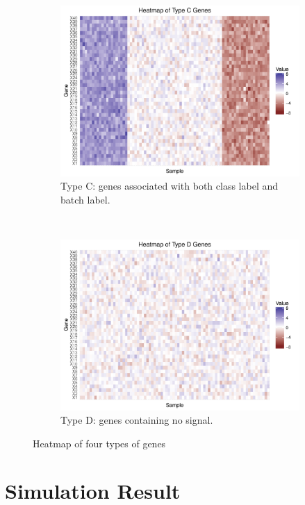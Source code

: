 \documentclass[11pt]{article}
\begin{document}
\begin{figure}[h!]
\begin{subfigure}[t]{0.4\textwidth}
    \includegraphics[width = \textwidth]{figures/Type_C_Gene.pdf}
    \caption{Type C: genes associated with both class label and batch label.}
    \end{subfigure}
    ~
    \centering
    \begin{subfigure}[t]{0.4\textwidth}
    \includegraphics[width = \textwidth]{figures/Type_D_Gene.pdf}
    \caption{Type D: genes containing no signal.}
    \end{subfigure}
    \caption{Heatmap of four types of genes}
    \label{fig:heatmap}
\end{figure}



\newpage
\section{Simulation Result}
\end{document}
